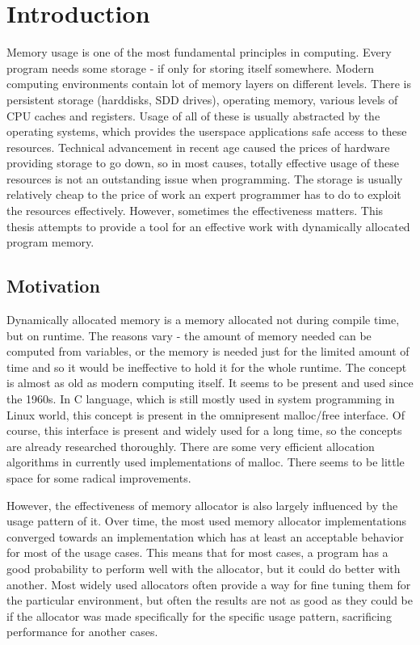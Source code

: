 
\chapter{Introduction}

Memory usage is one of the most fundamental principles in computing. Every program needs some storage - if only for storing itself somewhere. Modern computing environments contain lot of memory layers on different levels. There is persistent storage (harddisks, SDD drives), operating memory, various levels of CPU caches and registers. Usage of all of these is usually abstracted by the operating systems, which provides the userspace applications safe access to these resources. Technical advancement in recent age caused the prices of hardware providing storage to go down, so in most causes, totally effective usage of these resources is not an outstanding issue when programming. The storage is usually relatively cheap to the price of work an expert programmer has to do to exploit the resources effectively. However, sometimes the effectiveness matters. This thesis attempts to provide a tool for an effective work with dynamically allocated program memory.

\section{Motivation}

Dynamically allocated memory is a memory allocated not during compile time, but on runtime. The reasons vary - the amount of memory needed can be computed from variables, or the memory is needed just for the limited amount of time and so it would be ineffective to hold it for the whole runtime. The concept is almost as old as modern computing itself. It seems to be present and used since the 1960s.\cite{DSAsurvey} In C language, which is still mostly used in system programming in Linux world, this concept is present in the omnipresent malloc/free interface.\cite{glibc-man-malloc} Of course, this interface is present and widely used for a long time, so the concepts are already researched thoroughly. There are some very efficient allocation algorithms in currently used implementations of malloc. There seems to be little space for some radical improvements.

However, the effectiveness of memory allocator is also largely influenced by the usage pattern of it. Over time, the most used memory allocator implementations converged towards an implementation which has at least an acceptable behavior for most of the usage cases. This means that for most cases, a program has a good probability to perform well with the allocator, but it could do better with another. Most widely used allocators often provide a way for fine tuning them for the particular environment\cite{glibc-man-malloc}, but often the results are not as good as they could be if the allocator was made specifically for the specific usage pattern, sacrificing performance for another cases.

